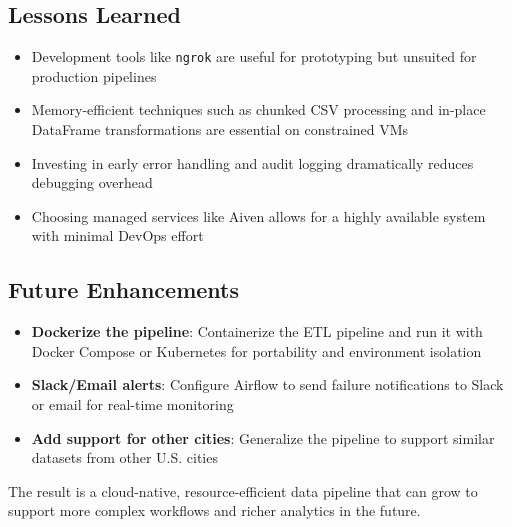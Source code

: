 \documentclass[12pt]{article}
\begin{document}
\subsection*{Lessons Learned}
\begin{itemize}
    \item Development tools like \texttt{ngrok} are useful for prototyping but unsuited for production pipelines
    \item Memory-efficient techniques such as chunked CSV processing and in-place DataFrame transformations are essential on constrained VMs
    \item Investing in early error handling and audit logging dramatically reduces debugging overhead
    \item Choosing managed services like Aiven allows for a highly available system with minimal DevOps effort
\end{itemize}

\subsection*{Future Enhancements}
\begin{itemize}
    \item \textbf{Dockerize the pipeline}: Containerize the ETL pipeline and run it with Docker Compose or Kubernetes for portability and environment isolation
    \item \textbf{Slack/Email alerts}: Configure Airflow to send failure notifications to Slack or email for real-time monitoring
    \item \textbf{Add support for other cities}: Generalize the pipeline to support similar datasets from other U.S. cities
\end{itemize}

\vspace{0.5cm}
\noindent The result is a cloud-native, resource-efficient data pipeline that can grow to support more complex workflows and richer analytics in the future.


\nocite{*}


\end{document}
